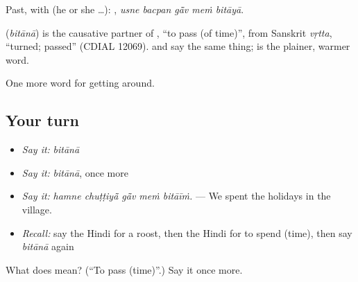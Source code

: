 Past, with  (he or she …):     , \emph{usne bacpan gā̃v meṁ bitāyā}.

\begin{cousinweb}
\textbf{} (\emph{bitānā}) is the causative partner of , \textquotedblleft{}to pass (of time)\textquotedblright{}, from Sanskrit \emph{vṛtta}, \textquotedblleft{}turned; passed\textquotedblright{} (CDIAL 12069).  and  say the same thing;  is the plainer, warmer word.
\end{cousinweb}

\begin{grammarlens}[title={What you've built}]
One more word for getting around.
\end{grammarlens}

\subsection*{Your turn}
\begin{itemize}
\raggedright
  \item \emph{Say it:} \emph{bitānā}
  \item \emph{Say it:} \emph{bitānā}, once more
  \item \emph{Say it:} \emph{hamne chuṭṭiyā̃ gā̃v meṁ bitāīṁ.} — We spent the holidays in the village.
  \item \emph{Recall:} say the Hindi for a roost, then the Hindi for to spend (time), then say \emph{bitānā} again
\end{itemize}

\begin{tcolorbox}[breakable,colback=teal!4,colframe=teal!35!black,title={Before you move on}]
What does  mean? (\textquotedblleft{}To pass (time)\textquotedblright{}.) Say it once more.
\end{tcolorbox}
